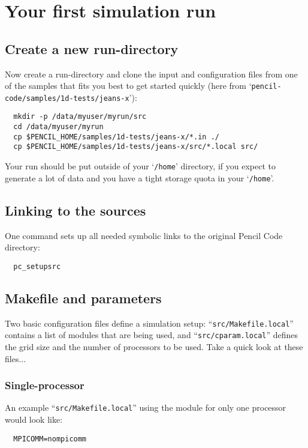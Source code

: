 \documentclass[a4paper,12pt]{article}
\newcommand{\file}[1]{``\texttt{#1}''}
\newcommand{\directory}[1]{`\texttt{#1}'}
\begin{document}
\section{Your first simulation run}

\subsection{Create a new run-directory}

Now create a run-directory and clone the input and configuration files from one of the samples that fits you best to get started quickly (here from \directory{pencil-code/samples/1d-tests/jeans-x}):
\begin{verbatim}
  mkdir -p /data/myuser/myrun/src
  cd /data/myuser/myrun
  cp $PENCIL_HOME/samples/1d-tests/jeans-x/*.in ./
  cp $PENCIL_HOME/samples/1d-tests/jeans-x/src/*.local src/
\end{verbatim}
Your run should be put outside of your \directory{/home} directory, if you expect to generate a lot of data and you have a tight storage quota in your \directory{/home}.

\subsection{Linking to the sources}

One command sets up all needed symbolic links to the original Pencil Code directory:
\begin{verbatim}
  pc_setupsrc
\end{verbatim}

\subsection{Makefile and parameters}

Two basic configuration files define a simulation setup: \file{src/Makefile.local} contains a list of modules that are being used, and \file{src/cparam.local} defines the grid size and the number of processors to be used.
Take a quick look at these files...


\subsubsection{Single-processor}
An example \file{src/Makefile.local} using the module for only one processor would look like:
\begin{verbatim}
  MPICOMM=nompicomm
\end{verbatim}
\end{document}
